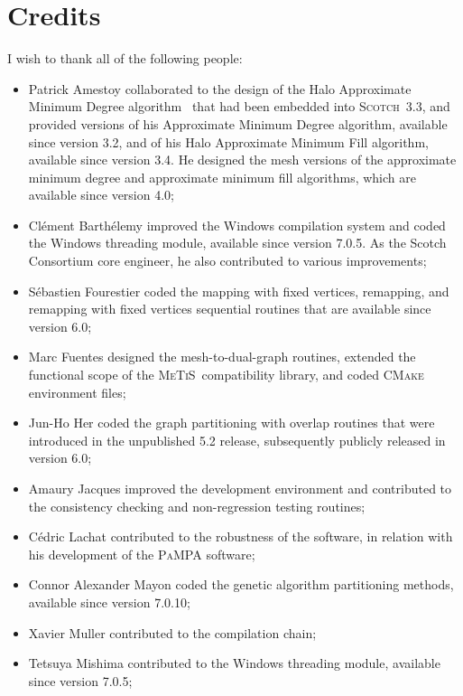 \documentclass{article}
\newcommand{\scotch}{\textsc{Scotch}}               %
\newcommand{\metis}{\mbox{\textsc{Me$\!$T$\!$iS}}}  %
\begin{document}

\section*{Credits}

I wish to thank all of the following people:
\begin{itemize}
\item
Patrick Amestoy collaborated to the design of the Halo Approximate
Minimum Degree algorithm~\cite{peroam99} that had been embedded into
\scotch\ \textsc{3.3}, and provided versions of his Approximate Minimum
Degree algorithm, available since version \textsc{3.2}, and of his
Halo Approximate Minimum Fill algorithm, available since version
\textsc{3.4}. He designed the mesh versions of the approximate
minimum degree and approximate minimum fill algorithms, which are
available since version \textsc{4.0};
\item
Clément Barthélemy improved the Windows compilation system and coded
the Windows threading module, available since version
\textsc{7.0.5}. As the Scotch Consortium core engineer, he also
contributed to various improvements;
\item
S\'ebastien Fourestier coded the mapping with fixed vertices,
remapping, and remapping with fixed vertices sequential routines that
are available since version \textsc{6.0};
\item
Marc Fuentes designed the mesh-to-dual-graph routines, extended the
functional scope of the \metis\ compatibility library, and coded
\textsc{CMake} environment files;
\item
Jun-Ho Her coded the graph partitioning with overlap routines that
were introduced in the unpublished \textsc{5.2} release, subsequently
publicly released in version \textsc{6.0};
\item
Amaury Jacques improved the development environment and contributed to
the consistency checking and non-regression testing routines;
\item
C\'edric Lachat contributed to the robustness of the software, in
relation with his development of the \textsc{PaMPA} software;
\item
Connor Alexander Mayon coded the genetic algorithm partitioning
methods, available since version \textsc{7.0.10};
\item
Xavier Muller contributed to the compilation chain;
\item
Tetsuya Mishima contributed to the Windows threading module, available
since version \textsc{7.0.5};

\end{itemize}
\end{document}
